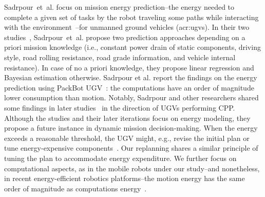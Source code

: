 Sadrpour~et~al. focus on mission energy prediction--the energy needed to complete a given set of tasks by the robot traveling some paths while interacting with the environment~\citep{sadrpour2013mission}--for unmanned ground vehicles (\Gls{acr:ugv}s). In their two studies~\citep{sadrpour2013mission,sadrpour2013experimental}, Sadrpour~et~al. propose two prediction approaches depending on a priori mission knowledge (i.e., constant power drain of static components, driving style, road rolling resistance, road grade information, and vehicle internal resistance). In case of no a priori knowledge, they propose linear regression and Bayesian estimation otherwise. Sadrpour et al. report the findings on the energy prediction using PackBot UGV~\citep{yamaichi2004packbot}: the computations have an order of magnitude lower consumption than motion. Notably, Sadrpour and other researchers shared some findings in later studies~\citep{sadrpour2014real,ersal2014keeping} in the direction of UGVs performing CPP. Although the studies and their later iterations focus on energy modeling, they propose a future instance in dynamic mission decision-making. When the energy exceeds a reasonable threshold, the UGV might, e.g., revise the initial plan or tune energy-expensive components~\citep{sadrpour2013mission}. Our replanning shares a similar principle of tuning the plan to accommodate energy expenditure. We further focus on computational aspects, as in the mobile robots under our study--and nonetheless, in recent energy-efficient robotics platforms--the motion energy has the same order of magnitude as computations energy~\citep{sudhakar2020balancing}.

